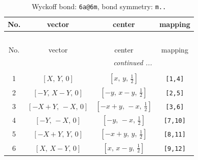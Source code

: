 \documentclass[fleqn,8pt]{jsarticle}
\begin{document}
\begin{longtable}{cccc}
\caption{Wyckoff bond: {\tt 6a@6m}, bond symmetry: {\tt m..}}
 \\
 \hline \hline
No. & vector & center & mapping \\ \hline \endfirsthead

\multicolumn{3}{l}{\tablename\ \thetable{}} \\
 \hline \hline
No. & vector & center & mapping \\ \hline \endhead

 \hline \hline
\multicolumn{3}{r}{\footnotesize\it continued ...} \\ \endfoot

 \hline \hline
\multicolumn{3}{r}{} \\ \endlastfoot

1 & $\left[ X,\, Y,\, 0 \right]$ & $\left[ x,\, y,\, \frac{1}{2} \right]$ & {\tt [1,4]} \\ \hline
2 & $\left[ - Y,\, X - Y,\, 0 \right]$ & $\left[ - y,\, x - y,\, \frac{1}{2} \right]$ & {\tt [2,5]} \\ \hline
3 & $\left[ - X + Y,\, - X,\, 0 \right]$ & $\left[ - x + y,\, - x,\, \frac{1}{2} \right]$ & {\tt [3,6]} \\ \hline
4 & $\left[ - Y,\, - X,\, 0 \right]$ & $\left[ - y,\, - x,\, \frac{1}{2} \right]$ & {\tt [7,10]} \\ \hline
5 & $\left[ - X + Y,\, Y,\, 0 \right]$ & $\left[ - x + y,\, y,\, \frac{1}{2} \right]$ & {\tt [8,11]} \\ \hline
6 & $\left[ X,\, X - Y,\, 0 \right]$ & $\left[ x,\, x - y,\, \frac{1}{2} \right]$ & {\tt [9,12]} \\
\end{longtable}
\renewcommand{\arraystretch}{1.2}
\end{document}
